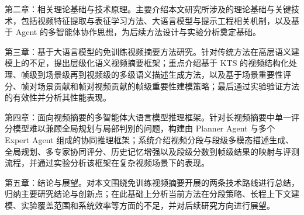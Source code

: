 第二章：相关理论基础与技术原理。主要介绍本文研究所涉及的理论基础与关键技术，包括视频特征提取与表征学习方法、大语言模型与提示工程相关机制，以及基于 Agent 的多智能体协作思想，为后续方法设计与实验分析奠定基础。

第三章：基于大语言模型的免训练视频摘要方法研究。针对传统方法在高层语义建模上的不足，提出层级化语义视频摘要框架；重点介绍基于 KTS 的视频结构化处理、帧级到场景级再到视频级的多级语义描述生成方法，以及基于场景重要性评分、帧对场景贡献和帧对视频贡献的帧级重要性建模策略；最后通过实验验证方法的有效性并分析其性能表现。

第四章：面向视频摘要的多智能体大语言模型推理框架。针对长视频摘要中单一评分模型难以兼顾全局规划与局部判别的问题，构建由 Planner Agent 与多个 Expert Agent 组成的协同推理框架；系统介绍视频分段与段级多模态描述生成、全局规划、多专家协同评分、历史记忆增强以及段级分数到帧级结果的映射与评测流程，并通过实验分析该框架在复杂视频场景下的表现。

第五章：结论与展望。对本文围绕免训练视频摘要开展的两条技术路线进行总结，归纳主要研究结论与创新点；在此基础上分析当前方法在分段策略、长程上下文建模、实验覆盖范围和系统效率等方面的不足，并对后续研究方向进行展望。